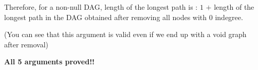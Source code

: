 \documentclass[answers]{exam}
\begin{document}
\begin{questions}
\begin{solution}
Therefore, for a non-null DAG, length of the longest path is : $1$ $+$ length of the longest path in the DAG obtained after removing all nodes with $0$ indegree.

(You can see that this argument is valid even if we end up with a void graph after removal)

\textbf{All 5 arguments proved!! }\par





\begin{comment}
    


We can prove it via induction:\par

\textit{ $P(n):$ For a non-null DAG with $n$ nodes, length of the longest path is : $1$ $+$ length of the longest path in the DAG obtained after removing all nodes with $0$ indegree.}

Lets check it for $P(1)$:\par
$P(1)$:length of the longest path is $=1+$ \textit{length of the longest path in the DAG obtained after removing all nodes with $0$ in-degree.}

After we remove all the in-degree $0$ we are left with a null graph, for which we have assumed that length of the longest path is $0$

Therefore, length of the longest path is $=1$ 

Which is indeed true for DAG with 1 node.

Let the statement be true for all DAGs till $k$ nodes. That is, $P(2)$,$P(3)$, .....$P(k)$ is true.\par


Lets analyze the DAG with $k+1$ nodes:\par

By argument 4, if $(v_1,v_2,v_3....,v_i)$ is the longest path(of length $i-1$) for a DAG with $k+1$ nodes, then their can't be a path longer than $(v_2,v_3....,v_i)$ (of length $i-2$)  in a DAG obtained after removing all the nodes with $0$ indegree.\par


\end{comment}
\end{solution}
\end{questions}
\end{document}
